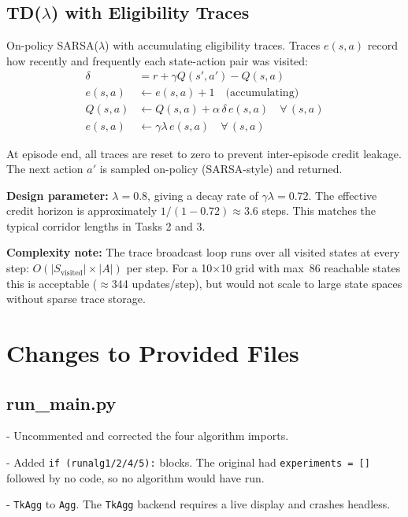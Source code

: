 \documentclass[11pt,letterpaper]{article}
\begin{document}
\subsection{TD($\lambda$) with Eligibility Traces}

On-policy SARSA($\lambda$) with accumulating eligibility traces. Traces $e(s,a)$ record
how recently and frequently each state-action pair was visited:
\begin{align}
  \delta &= r + \gamma Q(s', a') - Q(s, a) \\
  e(s,a) &\leftarrow e(s,a) + 1 \quad\text{(accumulating)} \\
  Q(s,a) &\leftarrow Q(s,a) + \alpha\,\delta\,e(s,a) \quad \forall\,(s,a) \\
  e(s,a) &\leftarrow \gamma\lambda\,e(s,a) \quad \forall\,(s,a)
\end{align}

At episode end, all traces are reset to zero to prevent inter-episode credit leakage.
The next action $a'$ is sampled on-policy (SARSA-style) and returned.

\textbf{Design parameter:} $\lambda = 0.8$, giving a decay rate of
$\gamma\lambda = 0.72$. The effective credit horizon is approximately
$1/(1-0.72) \approx 3.6$ steps. This matches the typical corridor lengths in
Tasks 2 and 3.

\textbf{Complexity note:} The trace broadcast loop runs over all visited states
at every step: $O(|S_{\text{visited}}| \times |A|)$ per step. For a 10$\times$10
grid with max~86 reachable states this is acceptable ($\approx$344 updates/step),
but would not scale to large state spaces without sparse trace storage.

\section{Changes to Provided Files}

\subsection{run\_main.py}

- Uncommented and corrected the four algorithm imports.

- Added \texttt{if (runalg1/2/4/5):} blocks.
  The original had \texttt{experiments = []} followed by no code, so no algorithm
  would have run.

- \texttt{TkAgg} to \texttt{Agg}. The
  \texttt{TkAgg} backend requires a live display and crashes headless.
\end{document}
